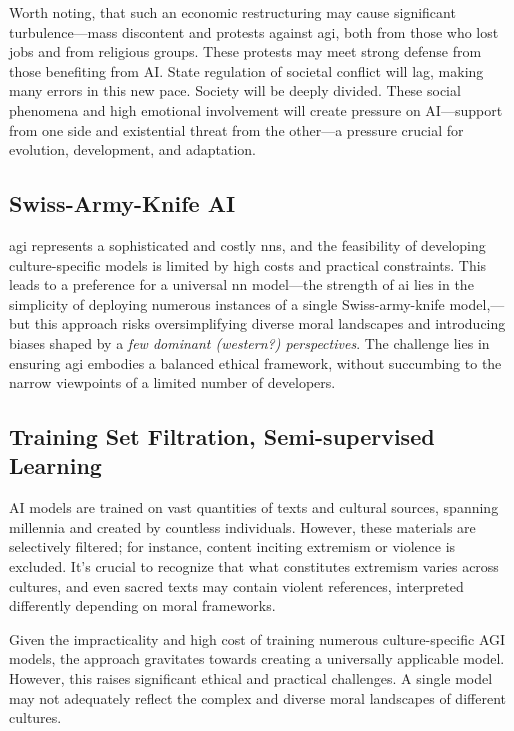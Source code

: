\documentclass[11pt,a4]{article}
\begin{document}
    Worth noting, that such an economic restructuring may cause
    significant turbulence---mass discontent and protests against \acrshort{agi},
    both from those who lost jobs and from religious groups.
     These protests may meet strong defense from those
     benefiting from AI. State regulation of
     societal conflict will lag, making many errors
     in this new pace. Society will be deeply divided.
     These social phenomena and high emotional involvement
     will create pressure on AI---support from
     one side and existential threat from the other---a pressure
     crucial for evolution, development, and adaptation.

    \subsection{Swiss-Army-Knife AI}


    \acrshort{agi} represents a sophisticated and costly \glspl{nn}, and
    the feasibility of developing culture-specific models is
    limited by high costs and practical constraints. This leads
    to a preference for a universal \acrshort{nn} model---the
    strength of \acrshort{ai} lies in the simplicity of deploying numerous
    instances of a single Swiss-army-knife model,---but this approach
    risks oversimplifying diverse moral landscapes and
    introducing biases shaped by a \textit{few dominant
    (western?) perspectives}. The challenge lies in
    ensuring \acrshort{agi} embodies a balanced ethical framework,
    without succumbing to the narrow viewpoints of a limited number of developers.

    \subsection{Training Set Filtration, Semi-supervised Learning}

    AI models are trained on vast quantities of texts and cultural sources,
    spanning millennia and created by countless individuals. However,
    these materials are selectively filtered; for instance, content
    inciting extremism or violence is excluded. It's crucial to
    recognize that what constitutes extremism varies across cultures,
    and even sacred texts may contain violent references, interpreted
    differently depending on moral frameworks.

    Given the impracticality and high cost of training numerous culture-specific AGI models,
    the approach gravitates towards creating a universally applicable model. However, this
    raises significant ethical and practical challenges. A single model may not adequately
    reflect the complex and diverse moral landscapes of different cultures.
\end{document}
